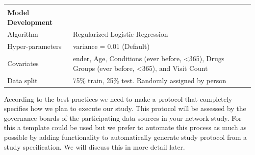 \documentclass[]{book}
\begin{document}
\begin{longtable}[]{@{}ll@{}}
\begin{minipage}[t]{0.42\columnwidth}\raggedright\strut
\strut
\end{minipage} & \begin{minipage}[t]{0.51\columnwidth}\raggedright\strut
\strut
\end{minipage}\tabularnewline
\begin{minipage}[t]{0.42\columnwidth}\raggedright\strut
\textbf{Model Development}\strut
\end{minipage} & \begin{minipage}[t]{0.51\columnwidth}\raggedright\strut
\strut
\end{minipage}\tabularnewline
\begin{minipage}[t]{0.42\columnwidth}\raggedright\strut
Algorithm\strut
\end{minipage} & \begin{minipage}[t]{0.51\columnwidth}\raggedright\strut
Regularized Logistic Regression\strut
\end{minipage}\tabularnewline
\begin{minipage}[t]{0.42\columnwidth}\raggedright\strut
Hyper-parameters\strut
\end{minipage} & \begin{minipage}[t]{0.51\columnwidth}\raggedright\strut
variance = 0.01 (Default)\strut
\end{minipage}\tabularnewline
\begin{minipage}[t]{0.42\columnwidth}\raggedright\strut
Covariates\strut
\end{minipage} & \begin{minipage}[t]{0.51\columnwidth}\raggedright\strut
ender, Age, Conditions (ever before, \textless{}365), Drugs Groups (ever
before, \textless{}365), and Visit Count\strut
\end{minipage}\tabularnewline
\begin{minipage}[t]{0.42\columnwidth}\raggedright\strut
Data split\strut
\end{minipage} & \begin{minipage}[t]{0.51\columnwidth}\raggedright\strut
75\% train, 25\% test. Randomly assigned by person\strut
\end{minipage}\tabularnewline
\bottomrule
\end{longtable}

According to the best practices we need to make a protocol that
completely specifies how we plan to execute our study. This protocol
will be assessed by the governance boards of the participating data
sources in your network study. For this a template could be used but we
prefer to automate this process as much as possible by adding
functionality to automatically generate study protocol from a study
specification. We will discuss this in more detail later.
\end{document}
